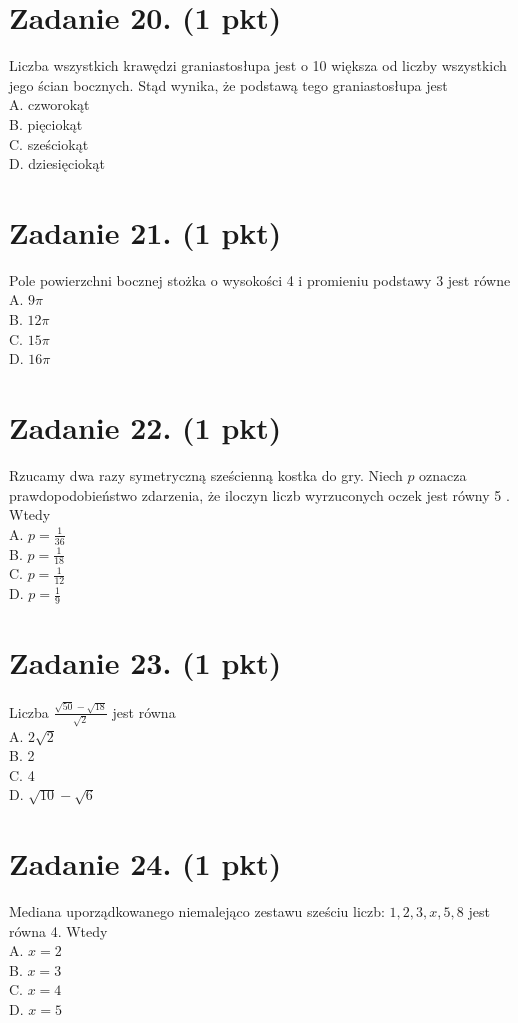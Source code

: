 \documentclass[10pt]{article}
\begin{document}
\section*{Zadanie 20. (1 pkt)}
Liczba wszystkich krawędzi graniastosłupa jest o 10 większa od liczby wszystkich jego ścian bocznych. Stąd wynika, że podstawą tego graniastosłupa jest\\
A. czworokąt\\
B. pięciokąt\\
C. sześciokąt\\
D. dziesięciokąt

\section*{Zadanie 21. (1 pkt)}
Pole powierzchni bocznej stożka o wysokości 4 i promieniu podstawy 3 jest równe\\
A. \(9 \pi\)\\
B. \(12 \pi\)\\
C. \(15 \pi\)\\
D. \(16 \pi\)

\section*{Zadanie 22. (1 pkt)}
Rzucamy dwa razy symetryczną sześcienną kostka do gry. Niech \(p\) oznacza prawdopodobieństwo zdarzenia, że iloczyn liczb wyrzuconych oczek jest równy 5 . Wtedy\\
A. \(p=\frac{1}{36}\)\\
B. \(p=\frac{1}{18}\)\\
C. \(p=\frac{1}{12}\)\\
D. \(p=\frac{1}{9}\)

\section*{Zadanie 23. (1 pkt)}
Liczba \(\frac{\sqrt{50}-\sqrt{18}}{\sqrt{2}}\) jest równa\\
A. \(2 \sqrt{2}\)\\
B. 2\\
C. 4\\
D. \(\sqrt{10}-\sqrt{6}\)

\section*{Zadanie 24. (1 pkt)}
Mediana uporządkowanego niemalejąco zestawu sześciu liczb: \(1,2,3, x, 5,8\) jest równa 4. Wtedy\\
A. \(x=2\)\\
B. \(x=3\)\\
C. \(x=4\)\\
D. \(x=5\)
\end{document}
